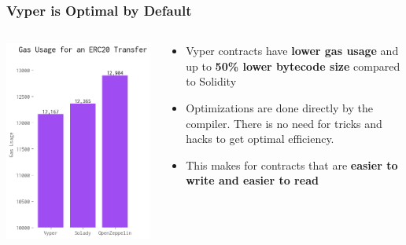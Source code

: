 \documentclass[aspectratio=169]{beamer}
\begin{document}
\begin{frame}
	\frametitle{Vyper is Optimal by Default}
	\begin{columns}[T,totalwidth=\textwidth]
		\begin{column}{0.35\textwidth}
			\vspace{2em} %
			\includegraphics[width=\columnwidth,height=0.75\paperheight,keepaspectratio]{charts/gaserc20.png}
		\end{column}
		\begin{column}{0.65\textwidth}
			\vspace{2em} %
			\begin{itemize}
				\item Vyper contracts have \textbf{lower gas usage} and up to \textbf{50\% lower bytecode size} compared to Solidity\\
				\item Optimizations are done directly by the compiler. There is no need for tricks and hacks to get optimal efficiency.\\
				\item This makes for contracts that are \textbf{easier to write and easier to read}\\
			\end{itemize}
			
		\end{column}
	\end{columns}
\end{frame}
\end{document}
